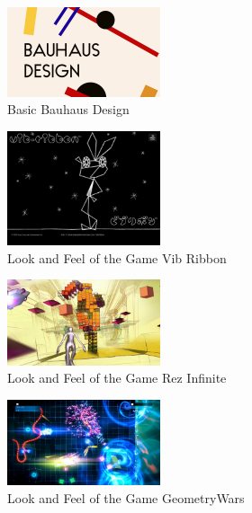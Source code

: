 \begin{figure}[htbp]
	\centering
		\includegraphics[width=0.40\textwidth]{img/Bauhaus.jpg}
	\caption[Basic Bauhaus Design]{Basic Bauhaus Design}
	\label{fig:Bauhaus}
\end{figure}
\begin{figure}[htbp]
	\centering
		\includegraphics[width=0.40\textwidth]{img/VibRibbon.jpg}
	\caption[Look and Feel of the Game Vib Ribbon]{Look and Feel of the Game Vib Ribbon}
	\label{fig:VibRibbon}
\end{figure}
\begin{figure}[htbp]
	\centering
		\includegraphics[width=0.40\textwidth]{img/RezInfinite.jpg}
	\caption[Look and Feel of the Game Rez Infinite]{Look and Feel of the Game Rez Infinite}
	\label{fig:RezInfinite}
\end{figure}
\begin{figure}[htbp]
	\centering
		\includegraphics[width=0.40\textwidth]{img/GeometryWars.jpg}
	\caption[Look and Feel of the Game Geometry Wars]{Look and Feel of the Game GeometryWars}
	\label{fig:GeometryWars}
\end{figure}


